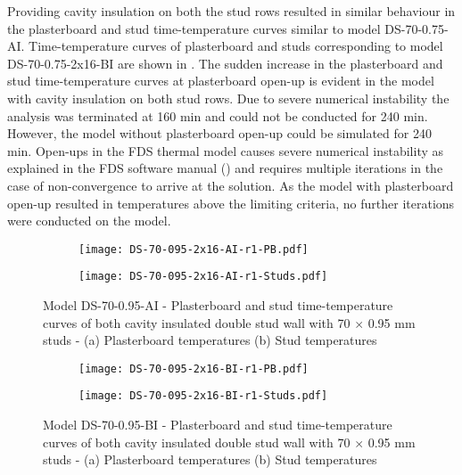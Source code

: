 Providing cavity insulation on both the stud rows resulted in similar behaviour in the plasterboard and stud time-temperature curves similar to model DS-70-0.75-AI. Time-temperature curves of plasterboard and studs corresponding to model DS-70-0.75-2x16-BI are shown in . The sudden increase in the plasterboard and stud time-temperature curves at plasterboard open-up is evident in the model with cavity insulation on both stud rows. Due to severe numerical instability the analysis was terminated at 160 min and could not be conducted for 240 min. However, the model without plasterboard open-up could be simulated for 240 min. Open-ups in the FDS thermal model causes severe numerical instability as explained in the FDS software manual (\cite{fds2013}) and requires multiple iterations in the case of non-convergence to arrive at the solution. As the model with plasterboard open-up resulted in temperatures above the limiting criteria, no further iterations were conducted on the model. 
\begin{figure}[!htbp]
	\centering
	\begin{subfigure}[b]{0.6\textwidth}
		\centering
		\texttt{[image: DS-70-095-2x16-AI-r1-PB.pdf]}
		\caption{}
		\label{subfig:DS-70-095-2x16-AI-r1-PB}
	\end{subfigure}
	\begin{subfigure}[b]{0.6\textwidth}
		\centering
		\texttt{[image: DS-70-095-2x16-AI-r1-Studs.pdf]}
		\caption{}
		\label{subfig:DS-70-095-2x16-AI-r1-Studs}
	\end{subfigure}
	   \caption{Model DS-70-0.95-AI - Plasterboard and stud time-temperature curves of both cavity insulated double stud wall with 70 $\times$ 0.95 mm studs - (a) Plasterboard temperatures (b) Stud temperatures}
	   \label{fig:DS-70-095-2x16-AI-r1}
\end{figure} 
\begin{figure}[!htbp]
	\centering
	\begin{subfigure}[b]{0.6\textwidth}
		\centering
		\texttt{[image: DS-70-095-2x16-BI-r1-PB.pdf]}
		\caption{}
		\label{subfig:DS-70-095-2x16-BI-r1-PB}
	\end{subfigure}
	\begin{subfigure}[b]{0.6\textwidth}
		\centering
		\texttt{[image: DS-70-095-2x16-BI-r1-Studs.pdf]}
		\caption{}
		\label{subfig:DS-70-095-2x16-BI-r1-Studs}
	\end{subfigure}
	   \caption{Model DS-70-0.95-BI - Plasterboard and stud time-temperature curves of both cavity insulated double stud wall with 70 $\times$ 0.95 mm studs - (a) Plasterboard temperatures (b) Stud temperatures}
	   \label{fig:DS-70-095-2x16-BI-r1}
\end{figure} 

